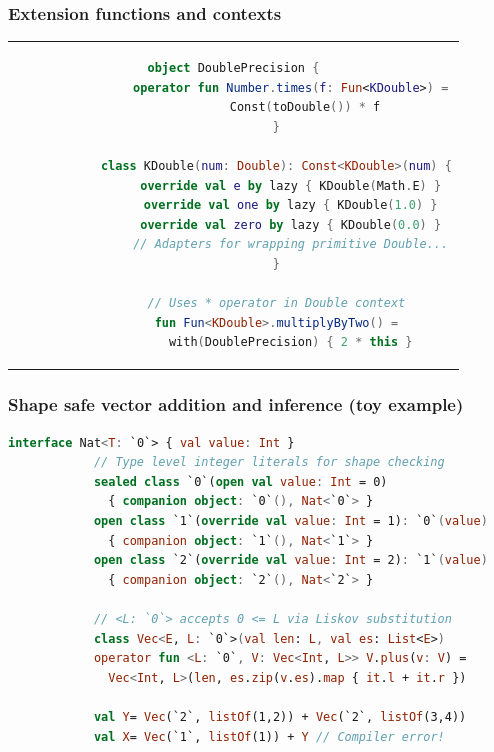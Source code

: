 \documentclass{beamer}
\begin{document}
    \begin{frame}[fragile]
        \frametitle{Extension functions and contexts}
\begin{center}
\begin{tabular}{c}
        \begin{lstlisting}[language=Kotlin, gobble=12]
            object DoublePrecision {
                operator fun Number.times(f: Fun<KDouble>) =
                    Const(toDouble()) * f
            }

            class KDouble(num: Double): Const<KDouble>(num) {
                override val e by lazy { KDouble(Math.E) }
                override val one by lazy { KDouble(1.0) }
                override val zero by lazy { KDouble(0.0) }
                // Adapters for wrapping primitive Double...
            }

            // Uses * operator in Double context
            fun Fun<KDouble>.multiplyByTwo() =
                with(DoublePrecision) { 2 * this }
        \end{lstlisting}
\end{tabular}
\end{center}
    \end{frame}


    \begin{frame}[fragile]
        \frametitle{Shape safe vector addition and inference (toy example)}
        \begin{lstlisting}[language=Kotlin, gobble=12, style=backtickstyle]
            interface Nat<T: `0`> { val value: Int }
            // Type level integer literals for shape checking
            sealed class `0`(open val value: Int = 0)
              { companion object: `0`(), Nat<`0`> }
            open class `1`(override val value: Int = 1): `0`(value)
              { companion object: `1`(), Nat<`1`> }
            open class `2`(override val value: Int = 2): `1`(value)
              { companion object: `2`(), Nat<`2`> }

            // <L: `0`> accepts 0 <= L via Liskov substitution
            class Vec<E, L: `0`>(val len: L, val es: List<E>)
            operator fun <L: `0`, V: Vec<Int, L>> V.plus(v: V) =
              Vec<Int, L>(len, es.zip(v.es).map { it.l + it.r })

            val Y= Vec(`2`, listOf(1,2)) + Vec(`2`, listOf(3,4))
            val X= Vec(`1`, listOf(1)) + Y // Compiler error!
        \end{lstlisting}
    \end{frame}
\end{document}
